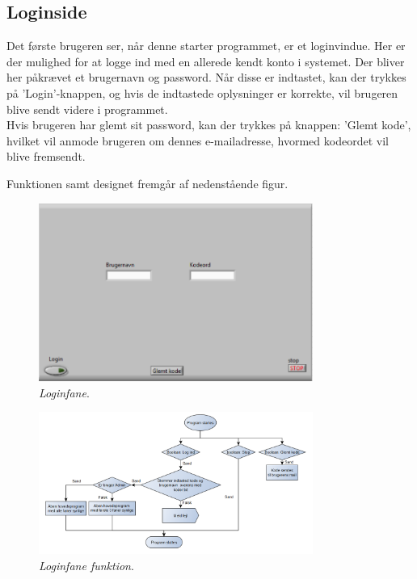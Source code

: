 \documentclass[../Hovedrapport.tex]{subfiles}
\begin{document}
\subsection*{Loginside}
Det første brugeren ser, når denne starter programmet, er et loginvindue. Her er der mulighed for at logge ind med en allerede kendt konto i systemet. Der bliver her påkrævet et brugernavn og password. Når disse er indtastet, kan der trykkes på 'Login'-knappen, og hvis de indtastede oplysninger er korrekte, vil brugeren blive sendt videre i programmet.\\
Hvis brugeren har glemt sit password, kan der trykkes på knappen: 'Glemt kode', hvilket vil anmode brugeren om dennes e-mailadresse, hvormed kodeordet vil blive fremsendt.

Funktionen samt designet fremgår af nedenstående figur.
\begin{figure}[H]
	\centering
	\includegraphics[width=0.80\textwidth]{Billeder/login.png}
	\caption{\textit{Loginfane}.}
	\label{fig:login}
\end{figure}
\begin{figure}[H]
	\centering
	\includegraphics[width=0.80\textwidth]{Billeder/login_vi.png}
	\caption{\textit{Loginfane funktion}.}
	\label{fig:login}
\end{figure}
\end{document}
